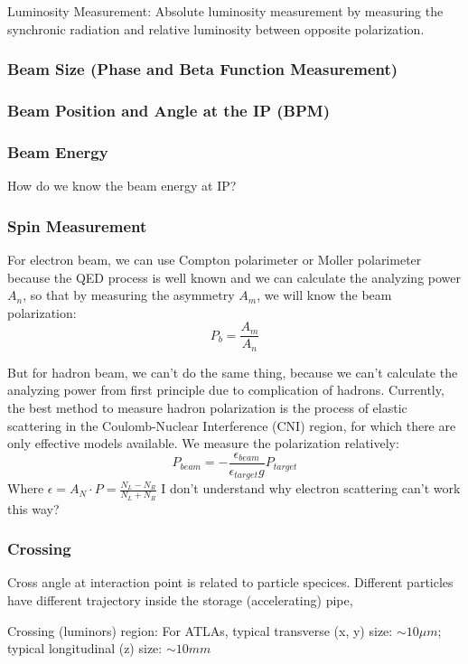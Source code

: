 Luminosity Measurement:
Absolute luminosity measurement by measuring the synchronic radiation and 
relative luminosity between opposite polarization.

\subsubsection{Beam Size (Phase and Beta Function Measurement)}

\subsubsection{Beam Position and Angle at the IP (BPM)}

\subsubsection{Beam Energy}
How do we know the beam energy at IP? 

\subsubsection{Spin Measurement}
For electron beam, we can use Compton polarimeter or Moller polarimeter because
the QED process is well known and we can calculate the analyzing power $A_n$, so
that by measuring the asymmetry $A_m$, we will know the beam polarization:
$$ P_b =  \frac{A_m}{A_n} $$

But for hadron beam, we can't do the same thing, because we can't calculate
the analyzing power from first principle due to complication of hadrons. 
Currently, the best method to measure hadron polarization is the process of 
elastic scattering in the Coulomb-Nuclear Interference (CNI) region, for which
there are only effective models available. We measure the polarization relatively:
$$ P_{beam} = -\frac{\epsilon_{beam}}{\epsilon_{target}g}P_{target}$$
Where $\epsilon = A_N\cdot P = \frac{N_L - N_R}{N_L + N_R}$
I don't understand why electron scattering can't work this way?
\subsubsection{Crossing}
Cross angle at interaction point is related to particle specices. Different
particles have different trajectory inside the storage (accelerating) pipe, 

Crossing (luminors) region: For ATLAs, typical transverse (x, y) size: $\sim 10 \mu m$;
typical longitudinal (z) size: $\sim 10 mm$

